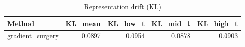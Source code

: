 \begin{table}[htbp]
\centering
\caption{Representation drift (KL)}
\label{tab:repr-drift}
\begin{tabular}{lrrrr}
\toprule
\textbf{Method} & \textbf{KL\_mean} & \textbf{KL\_low\_t} & \textbf{KL\_mid\_t} & \textbf{KL\_high\_t} \\
\midrule
gradient\_surgery & 0.0897 & 0.0954 & 0.0878 & 0.0903 \\
\bottomrule
\end{tabular}
\end{table}